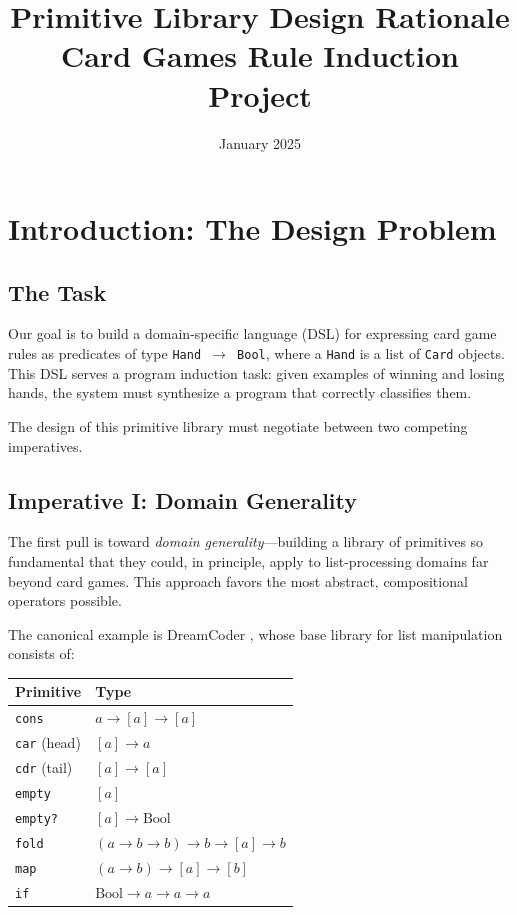 \documentclass[11pt]{article}
\title{\textbf{Primitive Library Design Rationale}\\[0.5em]\large Card Games Rule Induction Project}
\author{}
\date{January 2025}
\begin{document}
\maketitle

\section{Introduction: The Design Problem}

\subsection{The Task}

Our goal is to build a domain-specific language (DSL) for expressing card game rules as predicates of type \texttt{Hand $\to$ Bool}, where a \texttt{Hand} is a list of \texttt{Card} objects. This DSL serves a program induction task: given examples of winning and losing hands, the system must synthesize a program that correctly classifies them.

The design of this primitive library must negotiate between two competing imperatives.

\subsection{Imperative I: Domain Generality}

The first pull is toward \emph{domain generality}---building a library of primitives so fundamental that they could, in principle, apply to list-processing domains far beyond card games. This approach favors the most abstract, compositional operators possible.

The canonical example is DreamCoder \cite{ellis2021dreamcoder}, whose base library for list manipulation consists of:

\begin{center}
\begin{tabular}{ll}
\toprule
\textbf{Primitive} & \textbf{Type} \\
\midrule
\texttt{cons} & $a \to [a] \to [a]$ \\
\texttt{car} (head) & $[a] \to a$ \\
\texttt{cdr} (tail) & $[a] \to [a]$ \\
\texttt{empty} & $[a]$ \\
\texttt{empty?} & $[a] \to \text{Bool}$ \\
\texttt{fold} & $(a \to b \to b) \to b \to [a] \to b$ \\
\texttt{map} & $(a \to b) \to [a] \to [b]$ \\
\texttt{if} & $\text{Bool} \to a \to a \to a$ \\
\bottomrule
\end{tabular}
\end{center}
\end{document}
